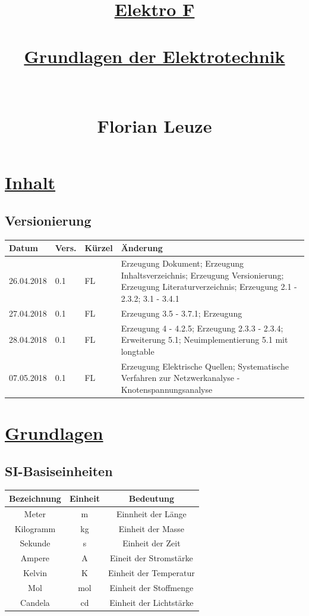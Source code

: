 \documentclass[12pt,a4paper]{article}%
\numberwithin{equation}{section}
\begin{document}


\author{}
\title{\underline{Elektro F} \\ $\;$ \\ \underline{Grundlagen der Elektrotechnik} \\ $\;$ \\ $\;$ \\ Florian Leuze}
\date{}

\maketitle %
\newpage
\section{\underline{Inhalt}}
\tableofcontents

\subsection{Versionierung}
\begin{tabular}{|p{2cm}|p{1cm}|p{1.5cm}|p{8.5cm}|}\hline
Datum & Vers. & Kürzel & Änderung \\ \hline
26.04.2018 & 0.1 & FL & Erzeugung Dokument; Erzeugung Inhaltsverzeichnis; Erzeugung Versionierung; Erzeugung Literaturverzeichnis; 
Erzeugung 2.1 - 2.3.2; 3.1 - 3.4.1 \\ \hline
27.04.2018 & 0.1 & FL & Erzeugung 3.5 - 3.7.1; Erzeugung  \\ \hline
28.04.2018 & 0.1 & FL & Erzeugung 4 - 4.2.5; Erzeugung 2.3.3 - 2.3.4; Erweiterung 5.1; Neuimplementierung 5.1 mit longtable \\ \hline
07.05.2018 & 0.1 & FL & Erzeugung Elektrische Quellen; Systematische Verfahren zur Netzwerkanalyse - Knotenspannungsanalyse \\ \hline
\end{tabular}

\newpage
 
\section{\underline{Grundlagen}}
\subsection{SI-Basiseinheiten}
\begin{tabular} {|c|c|c|}\hline
Bezeichnung & Einheit & Bedeutung \\ \hline
Meter & m & Einnheit der Länge \\ \hline
Kilogramm & kg & Einheit der Masse \\ \hline
Sekunde & s & Einheit der Zeit \\ \hline
Ampere & A & Eineit der Stromstärke \\ \hline
Kelvin & K & Einheit der Temperatur \\ \hline
Mol & mol & Einheit der Stoffmenge \\ \hline
Candela & cd & Einheit der Lichtstärke \\ \hline
\end{tabular}
\end{document}
